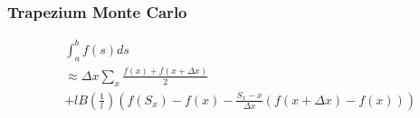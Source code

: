 \documentclass[18pt,aspectratio=149]{beamer}
\begin{document}



\begin{frame}
    \frametitle{Trapezium Monte Carlo}
    \fontsize{15}{17}\selectfont
    \begin{align}
         & \int_{a}^{b} f(s) ds                                      \\
         & \approx \Delta x \sum_{x}  \frac{f(x) + f(x+\Delta x)}{2} \\
         & + l B\left(\frac{1}{l}\right)
        \left(f(S_x) - f(x) - \frac{S_x - x}{\Delta x}(f(x+\Delta x) - f(x))\right)
    \end{align}
\end{frame}
\end{document}
